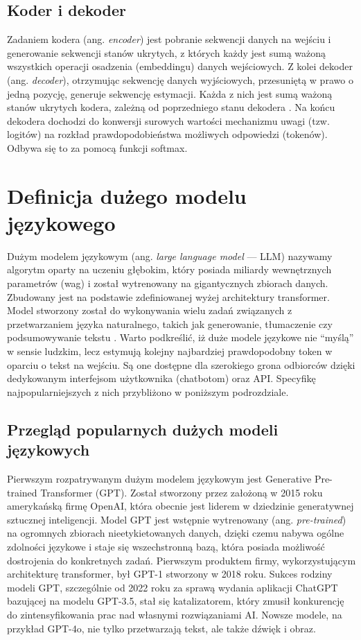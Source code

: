         
        \subsection{Koder i dekoder}
        Zadaniem kodera (ang. \textit{encoder}) jest pobranie sekwencji danych na wejściu i generowanie sekwencji stanów ukrytych, z których każdy jest sumą ważoną wszystkich operacji osadzenia (embeddingu) danych wejściowych. Z kolei dekoder (ang. \textit{decoder}), otrzymując sekwencję danych wyjściowych, przesuniętą w prawo o jedną pozycję, generuje sekwencję estymacji. Każda z nich jest sumą ważoną stanów ukrytych kodera, zależną od poprzedniego stanu dekodera \cite{llm_w_proj_oprogramowania2024}. Na końcu dekodera dochodzi do konwersji surowych wartości mechanizmu uwagi (tzw. logitów) na rozkład prawdopodobieństwa możliwych odpowiedzi (tokenów). Odbywa się to za pomocą funkcji softmax.
        
    
    \section{Definicja dużego modelu językowego}
    Dużym modelem językowym (ang. \textit{large language model} — LLM) nazywamy algorytm oparty na uczeniu głębokim, który posiada miliardy wewnętrznych parametrów (wag) i został wytrenowany na gigantycznych zbiorach danych. Zbudowany jest na podstawie zdefiniowanej wyżej architektury transformer. Model stworzony został do wykonywania wielu zadań związanych z przetwarzaniem języka naturalnego, takich jak generowanie, tłumaczenie czy podsumowywanie tekstu \cite{llm_w_proj_oprogramowania2024}. Warto podkreślić, iż duże modele językowe nie \enquote{myślą} w sensie ludzkim, lecz estymują kolejny najbardziej prawdopodobny token w oparciu o tekst na wejściu. Są one dostępne dla szerokiego grona odbiorców dzięki dedykowanym interfejsom użytkownika (chatbotom) oraz API. Specyfikę najpopularniejszych z nich przybliżono w poniższym podrozdziale.

    
        \subsection{Przegląd popularnych dużych modeli językowych}
        Pierwszym rozpatrywanym dużym modelem językowym jest Generative Pre-trained Transformer (GPT). Został stworzony przez założoną w 2015 roku amerykańską firmę OpenAI, która obecnie jest liderem w dziedzinie generatywnej sztucznej inteligencji. Model GPT jest wstępnie wytrenowany (ang. \textit{pre-trained}) na ogromnych zbiorach nieetykietowanych danych, dzięki czemu nabywa ogólne zdolności językowe i staje się wszechstronną bazą, która posiada możliwość dostrojenia do konkretnych zadań. Pierwszym produktem firmy, wykorzystującym architekturę transformer, był GPT-1 stworzony w 2018 roku. Sukces rodziny modeli GPT, szczególnie od 2022 roku za sprawą wydania aplikacji ChatGPT bazującej na modelu GPT-3.5, stał się katalizatorem, który zmusił konkurencję do zintensyfikowania prac nad własnymi rozwiązaniami AI. Nowsze modele, na przykład GPT-4o, nie tylko przetwarzają tekst, ale także dźwięk i obraz.

